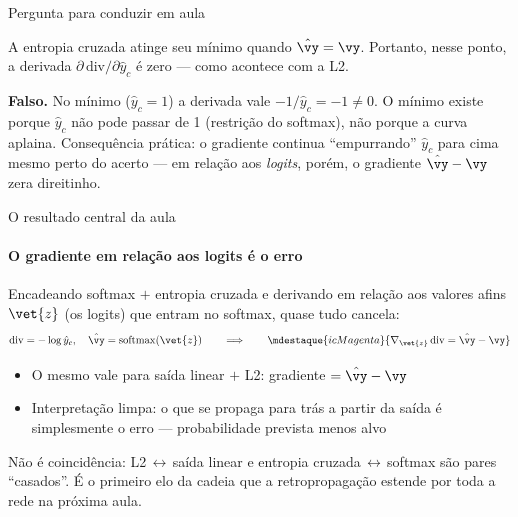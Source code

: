 \documentclass[aspectratio=169, 11pt]{beamer}
\begin{document}
\begin{frame}{Pergunta para conduzir em aula}
  \begin{quizbox}
    A entropia cruzada atinge seu mínimo quando $\hat{\vy} = \vy$. Portanto,
    nesse ponto, a derivada $\partial\,\mathrm{div} / \partial \hat{y}_c$ é zero
    — como acontece com a L2.

    \smallskip
  \end{quizbox}

  \pause

  \begin{respbox}
    \textbf{Falso.} No mínimo ($\hat{y}_c = 1$) a derivada vale $-1/\hat{y}_c = -1
    \neq 0$. O mínimo existe porque $\hat{y}_c$ não pode passar de 1 (restrição do
    softmax), não porque a curva aplaina. Consequência prática: o gradiente
    continua ``empurrando'' $\hat{y}_c$ para cima mesmo perto do acerto — em
    relação aos \emph{logits}, porém, o gradiente $\hat{\vy} - \vy$ zera direitinho.
  \end{respbox}
\end{frame}

\begin{frame}{O resultado central da aula}
  \framesubtitle{O gradiente em relação aos logits é o erro}

  Encadeando softmax $+$ entropia cruzada e derivando em relação aos valores
  afins $\vet{z}$ (os logits) que entram no softmax, quase tudo cancela:
  \[
    \mathrm{div} = -\log \hat{y}_c, \quad \hat{\vy} = \mathrm{softmax}(\vet{z})
    \qquad\Longrightarrow\qquad
    \mdestaque{icMagenta}{\nabla_{\vet{z}}\, \mathrm{div} = \hat{\vy} - \vy}
  \]

  \begin{itemize}\setlength{\itemsep}{0.2ex}
    \item O mesmo vale para saída linear $+$ L2: gradiente $= \hat{\vy} - \vy$
    \item Interpretação limpa: o que se propaga para trás a partir da saída é
          simplesmente \alert{o erro} — probabilidade prevista menos alvo
  \end{itemize}

  \begin{ideiabox}
    Não é coincidência: L2$\,\leftrightarrow\,$saída linear e entropia
    cruzada$\,\leftrightarrow\,$softmax são pares ``casados''. É o primeiro elo
    da cadeia que a retropropagação estende por toda a rede na próxima aula.
  \end{ideiabox}
\end{frame}
\end{document}
